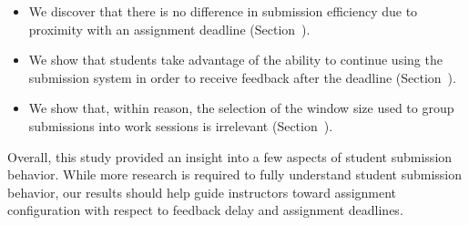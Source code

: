 \begin{itemize}
\item We discover that there is no difference in submission efficiency due to
  proximity with an assignment deadline (Section~).
\item We show that students take advantage of the ability to continue using the
  submission system in order to receive feedback after the deadline
  (Section~).
\item We show that, within reason, the selection of the window size used to
  group submissions into work sessions is irrelevant
  (Section~).
\end{itemize}

Overall, this study provided an insight into a few aspects of student
submission behavior. While more research is required to fully understand
student submission behavior, our results should help guide instructors toward
assignment configuration with respect to feedback delay and assignment
deadlines.
